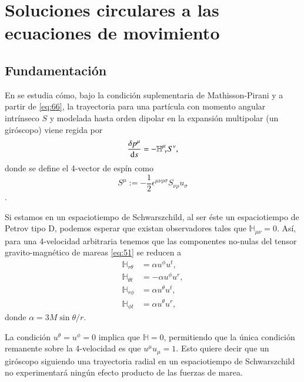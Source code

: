 \chapter{Soluciones circulares a las ecuaciones de movimiento}
\label{cap:4}
\newpage

\section{Fundamentación}

En \cite{Costa-Natario-Zilhao} se estudia cómo, bajo la condición suplementaria de Mathisson-Pirani y a partir de \eqref{eq:66}, la trayectoria para una partícula con momento angular intrínseco $S$ y modelada hasta orden dipolar en la expansión multipolar (un giróscopo) viene regida por
\begin{equation}
\frac{\delta p^{\mu}}{\mathrm{d}s} = -\mathbb{H}^{\mu}_{\ \nu} S^{\nu},
\end{equation}
donde se define el 4-vector de espín como $$S^{\mu} := -\frac{1}{2} \epsilon^{\mu \nu \rho \sigma} S_{\nu \rho} u_{\sigma}$$.

Si estamos en un espaciotiempo de Schwarszchild, al ser éste un espaciotiempo de Petrov tipo D, podemos esperar que existan observadores tales que $\mathbb{H}_{\mu \nu}=0$. Así, para una 4-velocidad arbitraria tenemos que las componentes no-nulas del tensor gravito-magnético de mareas \eqref{eq:51} se reducen a
\begin{align}
\mathbb{H}_{r \theta} &= \alpha u^{\phi} u^{t},\\
\mathbb{H}_{\theta t} &= -\alpha u^{\phi} u^{r},\\
\mathbb{H}_{r \phi} &= \alpha u^{\theta} u^{t},\\
\mathbb{H}_{\phi t} &= \alpha u^{\theta} u^{r},
\end{align}
donde $\alpha=3M\sin\theta /r$.

La condición $u^{\theta} = u^{\phi} = 0$ implica que $\mathbb{H}=0$, permitiendo que la única condición remanente sobre la 4-velocidad es que $u^{\mu} u_{\mu} = 1$. Esto quiere decir que un giróscopo siguiendo una trayectoria radial en un espaciotiempo de Schwarszchild no experimentará ningún efecto producto de las fuerzas de marea.

